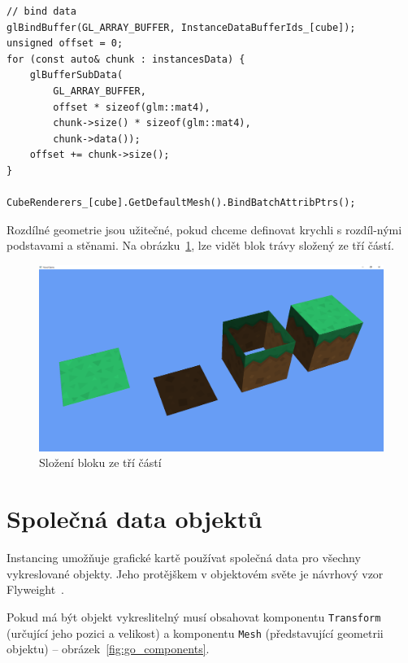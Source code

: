 \documentclass[thesis=M,czech]{FITthesis}[2019/12/23]
\begin{document}
\begin{verbatim}
// bind data
glBindBuffer(GL_ARRAY_BUFFER, InstanceDataBufferIds_[cube]);
unsigned offset = 0;
for (const auto& chunk : instancesData) {
    glBufferSubData(
        GL_ARRAY_BUFFER,
        offset * sizeof(glm::mat4), 
        chunk->size() * sizeof(glm::mat4), 
        chunk->data());
    offset += chunk->size();
}

CubeRenderers_[cube].GetDefaultMesh().BindBatchAttribPtrs();
\end{verbatim}

Rozdílné geometrie jsou užitečné, pokud chceme definovat krychli s rozdíl-nými podstavami a stěnami. Na obrázku~\ref{fig:block_composition}, lze vidět blok trávy složený ze tří částí.

\begin{figure}\centering
	\includegraphics[width=\textwidth]{images/block_composition}
	\caption[Složení bloku ze tří částí]{Složení bloku ze tří částí}\label{fig:block_composition}
\end{figure}

\section{Společná data objektů}

Instancing umožňuje grafické kartě používat společná data pro všechny vykreslované objekty. Jeho protějškem v objektovém světe je návrhový vzor Flyweight~\cite{gpp_fly}.

Pokud má být objekt vykreslitelný musí obsahovat komponentu \texttt{Transform} (určující jeho pozici a velikost) a komponentu \texttt{Mesh} (představující geometrii objektu) -- obrázek~\ref{fig:go_components}.
\end{document}
